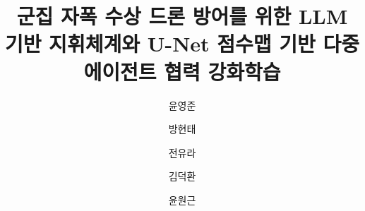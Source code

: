 \documentclass[preprint,12pt]{elsarticle}
\begin{document}
\begin{frontmatter}

\title{군집 자폭 수상 드론 방어를 위한 LLM 기반 지휘체계와 U-Net 점수맵 기반
       다중 에이전트 협력 강화학습}

\author[cnu]{윤영준}

\author[cnu]{방현태}
\author[kaist]{전유라}
\author[kaist]{김덕환}
\author[cnu]{윤원근}









\end{frontmatter}














% 



\end{document}
